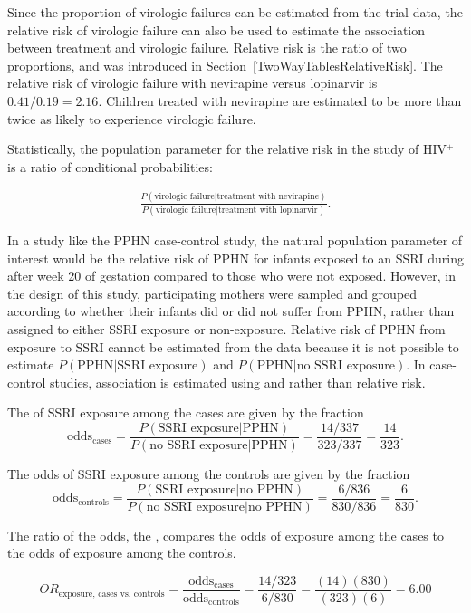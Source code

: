 Since the proportion of virologic failures can be estimated from the trial data, the relative risk of virologic failure can also be used to estimate the association between treatment and virologic failure. Relative risk is the ratio of two proportions, and was introduced in Section~\ref{TwoWayTablesRelativeRisk}.  The relative risk of virologic failure with nevirapine versus lopinarvir is $0.41/0.19 = 2.16$.  Children treated with nevirapine are estimated to be more than twice as likely to experience virologic failure.  

Statistically, the population parameter for the relative risk in the study of HIV$^+$ is a ratio of conditional probabilities:

\begin{align*}
  \frac{P(\text{virologic failure}| \text{treatment with nevirapine})}
  {P(\text{virologic failure}|\text{treatment with lopinarvir})}.
\end{align*}

In a study like the PPHN case-control study, the natural population parameter of interest would be the relative risk of PPHN for infants exposed to an SSRI during after week 20 of gestation compared to those who were not exposed. However, in the design of this study, participating mothers were sampled and grouped according to whether their infants did or did not suffer from PPHN, rather than assigned to either SSRI exposure or non-exposure. Relative risk of PPHN from exposure to SSRI cannot be estimated from the data because it is not possible to estimate $P(\text{PPHN} | \text{SSRI exposure})$ and $P(\text{PPHN} | \text{no SSRI exposure})$. In case-control studies, association is estimated using  and  rather than relative risk.

The  of SSRI exposure among the cases are given by the fraction
\[
  \text{odds$_\text{cases}$} = \frac{P(\text{SSRI exposure} | \text{PPHN})}
  {P(\text{no SSRI exposure} | \text{PPHN})} = \frac{14/337}{323/337} = \frac{14}{323}.
\]

The odds of SSRI exposure among the controls are given by the fraction
\[
  \text{odds$_\text{controls}$} = \frac{P(\text{SSRI exposure} | \text{no PPHN})}
  {P(\text{no SSRI exposure} | \text{no PPHN})} = \frac{6/836}{830/836} = \frac{6}{830}.
\]

The ratio of the odds, the , compares the odds of exposure among the cases to the odds of exposure among the controls. 

\[OR_{\text{exposure, cases vs. controls}} = \frac{\text{odds$_\text{cases}$}}{\text{odds$_\text{controls}$}} = \frac{14/323}{6/830} = \frac{(14)(830)}{(323)(6)} =  6.00 \]

